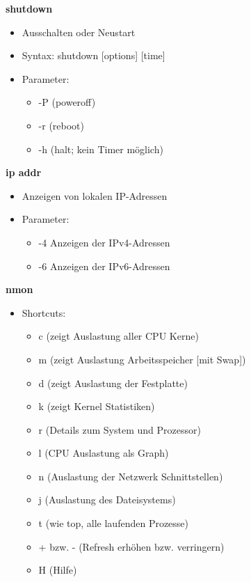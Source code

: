 \documentclass{article}
\begin{document}
\textbf{shutdown}
\begin{itemize}
	\item Ausschalten oder Neustart
	\item Syntax: shutdown [options] [time]
	\item Parameter:
	\begin{itemize}
		\item -P (poweroff)
		\item -r (reboot)
		\item -h (halt; kein Timer möglich)
	\end{itemize}
\end{itemize}

\textbf{ip addr}
\begin{itemize}
	\item Anzeigen von lokalen IP-Adressen
	\item Parameter:
	\begin{itemize}
		\item -4 Anzeigen der IPv4-Adressen
		\item -6 Anzeigen der IPv6-Adressen
	\end{itemize}
\end{itemize}

\textbf{nmon}
\begin{itemize}
	\item Shortcuts:
	\begin{itemize}
		\item c (zeigt Auslastung aller CPU Kerne)
		\item m (zeigt Auslastung Arbeitsspeicher [mit Swap])
		\item d (zeigt Auslastung der Festplatte)
		\item k (zeigt Kernel Statistiken)
		\item r (Details zum System und Prozessor)
		\item l (CPU Auslastung als Graph)
		\item n (Auslastung der Netzwerk Schnittstellen)
		\item j (Auslastung des Dateisystems)
		\item t (wie top, alle laufenden Prozesse)
		\item + bzw. - (Refresh erhöhen bzw. verringern)
		\item H (Hilfe)
	\end{itemize}
\end{itemize}
\end{document}
